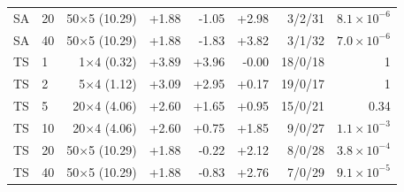 \begin{tabular}{llrrrrrr}
SA & 20 & 50$\times$5 (10.29) & +1.88 & -1.05 & +2.98 & 3/2/31 & $8.1 \times 10^{-6}$ \\
SA & 40 & 50$\times$5 (10.29) & +1.88 & -1.83 & +3.82 & 3/1/32 & $7.0 \times 10^{-6}$ \\
TS & 1 & 1$\times$4 (0.32) & +3.89 & +3.96 & -0.00 & 18/0/18 & 1 \\
TS & 2 & 5$\times$4 (1.12) & +3.09 & +2.95 & +0.17 & 19/0/17 & 1 \\
TS & 5 & 20$\times$4 (4.06) & +2.60 & +1.65 & +0.95 & 15/0/21 & 0.34 \\
TS & 10 & 20$\times$4 (4.06) & +2.60 & +0.75 & +1.85 & 9/0/27 & $1.1 \times 10^{-3}$ \\
TS & 20 & 50$\times$5 (10.29) & +1.88 & -0.22 & +2.12 & 8/0/28 & $3.8 \times 10^{-4}$ \\
TS & 40 & 50$\times$5 (10.29) & +1.88 & -0.83 & +2.76 & 7/0/29 & $9.1 \times 10^{-5}$ \\
\bottomrule
\end{tabular}
